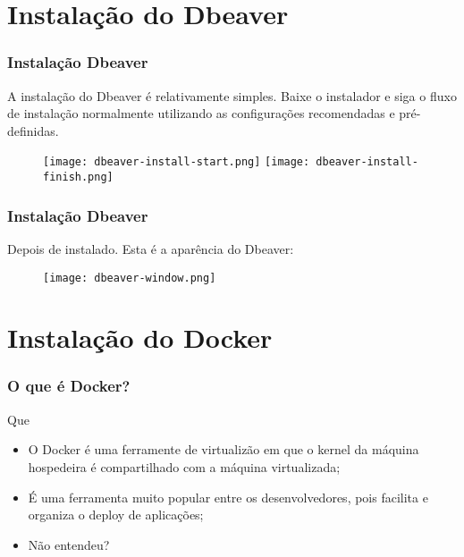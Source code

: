 \documentclass[t, 10pt, aspectratio=169, table, x11names]{beamer}
\begin{document}
	\section{Instalação do Dbeaver}

	\begin{frame}
		\frametitle{Instalação Dbeaver}
		A instalação do Dbeaver é relativamente simples. Baixe o instalador e siga o fluxo de instalação normalmente utilizando as configurações recomendadas e pré-definidas.
		\begin{figure}[h]
			\centering\vspace{2mm}
			\texttt{[image: dbeaver-install-start.png]}
			\hspace{0.5cm}
			\texttt{[image: dbeaver-install-finish.png]}
		\end{figure}
	\end{frame}
	
	\begin{frame}
		\frametitle{Instalação Dbeaver}
		Depois de instalado. Esta é a aparência do Dbeaver:
		\begin{figure}[h]
			\centering\vspace{2mm}
			\texttt{[image: dbeaver-window.png]}
		\end{figure}
	\end{frame}

	\section{Instalação do Docker}

	\begin{frame}
		\frametitle{O que é Docker?}
		Que 
		\begin{itemize}
			\item[] O Docker é uma ferramente de virtualizão em que o kernel da máquina hospedeira é compartilhado com a máquina virtualizada;
			\item[] É uma ferramenta muito popular entre os desenvolvedores, pois facilita e organiza o deploy de aplicações;
			\item[] Não entendeu? 
		\end{itemize}
	\end{frame}
\end{document}
